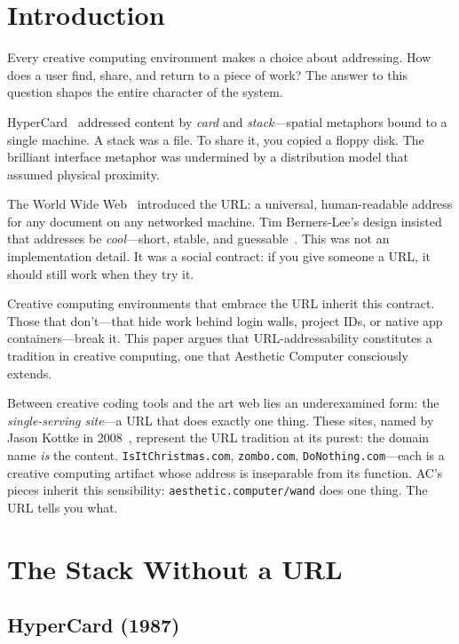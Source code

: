 \documentclass[10pt,letterpaper,twocolumn]{article}
\newcommand{\code}[1]{\texttt{#1}}
\begin{document}
\section{Introduction}

Every creative computing environment makes a choice about addressing. How does a user find, share, and return to a piece of work? The answer to this question shapes the entire character of the system.

HyperCard~\citep{atkinson1987hypercard} addressed content by \emph{card} and \emph{stack}---spatial metaphors bound to a single machine. A stack was a file. To share it, you copied a floppy disk. The brilliant interface metaphor was undermined by a distribution model that assumed physical proximity.

The World Wide Web~\citep{berners-lee1994www} introduced the URL: a universal, human-readable address for any document on any networked machine. Tim Berners-Lee's design insisted that addresses be \emph{cool}---short, stable, and guessable~\citep{berners-lee1998cool}. This was not an implementation detail. It was a social contract: if you give someone a URL, it should still work when they try it.

Creative computing environments that embrace the URL inherit this contract. Those that don't---that hide work behind login walls, project IDs, or native app containers---break it. This paper argues that URL-addressability constitutes a tradition in creative computing, one that Aesthetic Computer consciously extends.

Between creative coding tools and the art web lies an underexamined form: the \emph{single-serving site}---a URL that does exactly one thing. These sites, named by Jason Kottke in 2008~\citep{kottke2008singleserving}, represent the URL tradition at its purest: the domain name \emph{is} the content. \code{IsItChristmas.com}, \code{zombo.com}, \code{DoNothing.com}---each is a creative computing artifact whose address is inseparable from its function. AC's pieces inherit this sensibility: \code{aesthetic.computer/wand} does one thing. The URL tells you what.

\section{The Stack Without a URL}

\subsection{HyperCard (1987)}
\end{document}
